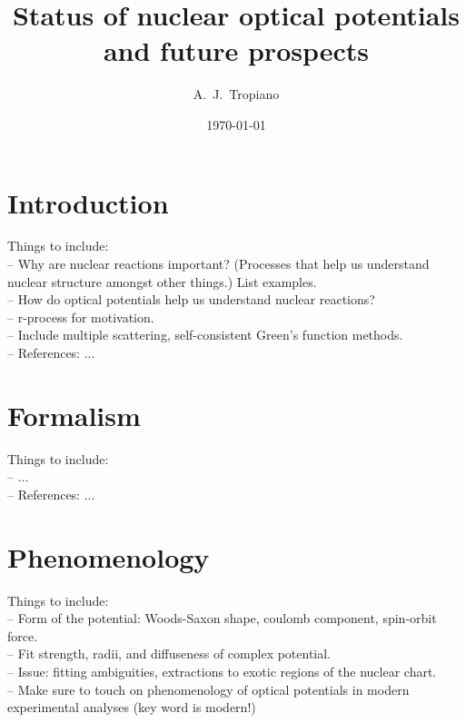 \documentclass[preprintnumbers,floatfix,aps,prc,preprint,nofootinbib]{revtex4-1}
\begin{document}
\title{Status of nuclear optical potentials and future prospects}


\author{A.~J.~Tropiano}


\date{\today}

\maketitle

\newpage


\section{Introduction}
\label{sec:intro}


Things to include:
\\
-- Why are nuclear reactions important? (Processes that help us understand nuclear structure amongst other things.) List examples.
\\
-- How do optical potentials help us understand nuclear reactions?
\\
-- r-process for motivation.
\\
-- Include multiple scattering, self-consistent Green's function methods.
\\
-- References: ...


\section{Formalism}
\label{sec:formalism}


Things to include:
\\
-- ...
\\
-- References: ...


\section{Phenomenology}
\label{sec:phenomenology}


Things to include:
\\
-- Form of the potential: Woods-Saxon shape, coulomb component, spin-orbit force.
\\
-- Fit strength, radii, and diffuseness of complex potential.
\\
-- Issue: fitting ambiguities, extractions to exotic regions of the nuclear chart.
\\
-- Make sure to touch on phenomenology of optical potentials in modern experimental analyses (key word is modern!)
\end{document}
